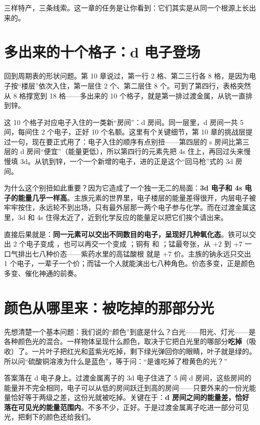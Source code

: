 三样特产，三条线索。这一章的任务是让你看到：它们其实是从同一个根源上长出来的。

\section{多出来的十个格子：d 电子登场}

回到周期表的形状问题。第 10 章说过，第一行 2 格、第二三行各 8 格，是因为电子按“楼层”依次入住，第一层住 2 个、第二层住 8 个。可到了第四行，表格突然从 8 格撑宽到 18 格——多出来的 10 个格子，就是第一排过渡金属，从钪一直排到锌。

这 10 个格子对应电子入住的一类新“房间”：d 房间。同一层里，d 房间一共 5 间，每间住 2 个电子，正好 10 个名额。这里有个关键细节，第 10 章的挑战层提过一句，现在要正式用了：电子入住的顺序有点别扭——第四层的 s 房间比第三层的 d 房间“便宜”（能量更低），所以第四行的元素先把 4s 住上，再回过头来慢慢填 3d。从钪到锌，一个一个新增的电子，进的正是这个“回马枪”式的 3d 房间。

为什么这个别扭如此重要？因为它造成了一个独一无二的局面：\textbf{3d 电子和 4s 电子的能量几乎一样高}。主族元素的世界里，电子楼层的能量差得很开，内层电子被牢牢按住，永远轮不到出场，只有最外层那一两个电子参与化学。而在过渡金属这里，3d 和 4s 住得太近了，近到化学反应的能量足以把它们挨个请出来。

直接后果就是：\textbf{同一元素可以交出不同数目的电子，呈现好几种氧化态}。铁可以交出 2 个电子变成 ，也可以再交一个变成 ；铜有  和 ；锰最夸张，从 $+2$ 到 $+7$ 一口气排出七八种价态——紫药水里的高锰酸根  就是 $+7$ 价。主族的钠永远只交出 1 个电子，一辈子一个价；而锰一个人就能演出七八种角色。价态多变，正是颜色多变、催化神通的前奏。

\section{颜色从哪里来：被吃掉的那部分光}

先想清楚一个基本问题：我们说的“颜色”到底是什么？白光——阳光、灯光——是各种颜色光的混合。一样物体呈现什么颜色，取决于它把白光里的哪部分\textbf{吃掉}（吸收）了。一片叶子把红光和蓝紫光吃掉，剩下绿光弹回你的眼睛，叶子就是绿的。所以问“硫酸铜溶液为什么是蓝色”，等于问：“是谁吃掉了橙黄色的光？”

答案落在 d 电子身上。过渡金属离子的 3d 电子住进了 5 间 d 房间，这些房间的能量并不完全相同，电子可以从低的房间跃迁到高的房间——只要外来的一份光能量恰好等于两级之差，这份光就被吃掉。关键在于：\textbf{d 房间之间的能量差，恰好落在可见光的能量范围内}。不多不少，正好。于是过渡金属离子吃进一部分可见光，把剩下的颜色还给我们。

